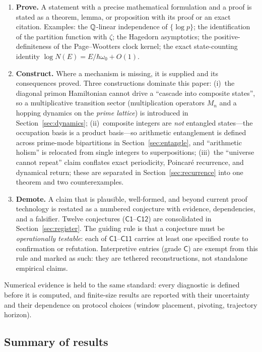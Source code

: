 \begin{enumerate}[leftmargin=1.6em]
\item \textbf{Prove.} A statement with a precise mathematical formulation and a proof is
stated as a theorem, lemma, or proposition with its proof or an exact citation. Examples: the
$\mathbb{Q}$-linear independence of $\{\log p\}$; the identification of the partition function with
$\zeta$; the Hagedorn asymptotics; the positive-definiteness of the Page--Wootters clock kernel;
the exact state-counting identity $\log N(E)=E/\hbar\omega_{0}+O(1)$.
\item \textbf{Construct.} Where a mechanism is missing, it is supplied and its consequences
proved. Three constructions dominate this paper:
(i)~the diagonal primon Hamiltonian cannot drive a ``cascade into composite states'', so a
multiplicative transition sector (multiplication operators $M_{n}$ and a hopping dynamics on
the \emph{prime lattice}) is introduced in Section~\ref{sec:dynamics};
(ii)~composite integers are \emph{not} entangled states---the occupation basis is a product
basis---so arithmetic entanglement is defined across prime-mode bipartitions in
Section~\ref{sec:entangle}, and ``arithmetic holism'' is relocated from single integers to
superpositions;
(iii)~the ``universe cannot repeat'' claim conflates exact periodicity, Poincar\'e recurrence,
and dynamical return; these are separated in Section~\ref{sec:recurrence} into one theorem and
two counterexamples.
\item \textbf{Demote.} A claim that is plausible, well-formed, and beyond current proof
technology is restated as a numbered conjecture with evidence, dependencies, and a falsifier.
Twelve conjectures ($\mathsf{C1}$--$\mathsf{C12}$) are consolidated in Section~\ref{sec:register}.
The guiding rule is that a conjecture must be \emph{operationally testable}: each of
$\mathsf{C1}$--$\mathsf{C11}$ carries at least one specified route to confirmation or refutation.
Interpretive entries (grade $\mathsf{C}$) are exempt from this rule and marked as such: they are
tethered reconstructions, not standalone empirical claims.
\end{enumerate}

Numerical evidence is held to the same standard: every diagnostic is defined before it is
computed, and finite-size results are reported with their uncertainty and their dependence on
protocol choices (window placement, pivoting, trajectory horizon).

\subsection{Summary of results}


